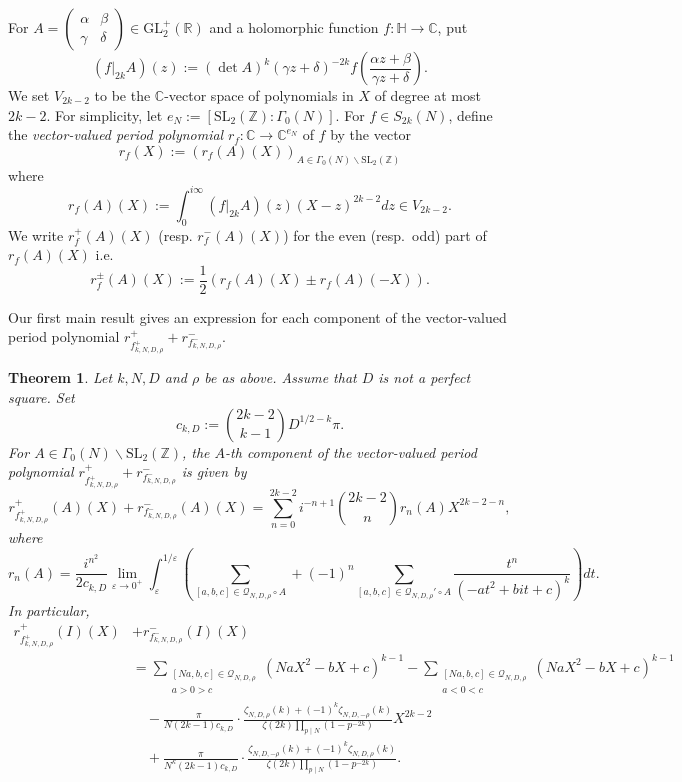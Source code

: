 \documentclass[12pt]{amsart}
\numberwithin{equation}{section}
\newtheorem{theorem}{Theorem}[section]
\theoremstyle{definition}
\begin{document}
For $A=\left(\begin{smallmatrix}
    \alpha & \beta \\ \gamma & \delta
\end{smallmatrix}\right)\in\mathrm{GL}_{2}^{+}(\mathbb{R})$ and a holomorphic function $f:\mathbb{H}\rightarrow\mathbb{C}$, put
$$(f|_{2k}A)(z):=(\det A)^{k}(\gamma z+\delta)^{-2k}f\left(\frac{\alpha z+\beta}{\gamma z+\delta}\right).$$
We set $V_{2k-2}$ to be the $\mathbb{C}$-vector space of polynomials in $X$ of degree at most $2k-2$. For simplicity, let $e_{N}:=[\mathrm{SL}_{2}(\mathbb{Z}):\Gamma_{0}(N)]$.
For $f\in S_{2k}(N)$, define the \textit{vector-valued period polynomial} $r_{f}:\mathbb{C}\rightarrow\mathbb{C}^{e_{N}}$ of $f$ by the vector
$$r_{f}(X):=(r_{f}(A)(X))_{A\in\Gamma_{0}(N)\backslash\mathrm{SL}_{2}(\mathbb{Z})}$$
where
$$r_{f}(A)(X):=\int_{0}^{i\infty}(f|_{2k}A)(z)(X-z)^{2k-2}dz\in V_{2k-2}.$$
We write $r_{f}^{+}(A)(X)$ (resp. $r_{f}^{-}(A)(X)$) for the even (resp.\ odd) part of $r_{f}(A)(X)$ i.e.
$$r_{f}^{\pm}(A)(X):=\frac{1}{2}(r_{f}(A)(X)\pm r_{f}(A)(-X)).$$

Our first main result gives an expression for each component of the vector-valued period polynomial $r_{f_{k,N,D,\rho}^{+}}^{+}+r_{f_{k,N,D,\rho}^{-}}^{-}$.

\begin{theorem}\label{thm-period}
Let $k,N,D$ and $\rho$ be as above. Assume that $D$ is not a perfect square. Set
$$c_{k,D}:=\binom{2k-2}{k-1}D^{1/2-k}\pi.$$
For $A\in\Gamma_{0}(N)\backslash \mathrm{SL}_{2}(\mathbb{Z})$, the $A$-th component of the vector-valued period polynomial $r_{f_{k,N,D,\rho}^{+}}^{+}+r_{f_{k,N,D,\rho}^{-}}^{-}$ is given by
$$r_{f_{k,N,D,\rho}^{+}}^{+}(A)(X)+r_{f_{k,N,D,\rho}^{-}}^{-}(A)(X)=\sum_{n=0}^{2k-2}i^{-n+1}\binom{2k-2}{n}r_{n}(A)X^{2k-2-n},$$
where
\begin{equation*}
    r_{n}(A)=\frac{i^{n^{2}}}{2c_{k,D}}\lim_{\varepsilon\rightarrow 0^{+}}\int_{\varepsilon}^{1/\varepsilon}\left(\sum_{[a,b,c]\in\mathcal{Q}_{N,D,\rho}\circ A}+(-1)^{n}\sum_{[a,b,c]\in\mathcal{Q}_{N,D,\rho}'\circ A}\frac{t^{n}}{(-at^{2}+bit+c)^{k}}\right)dt.
\end{equation*}
In particular,
\begin{align*}
r_{f_{k,N,D,\rho}^{+}}^{+}(I)(X)&+r_{f_{k,N,D,\rho}^{-}}^{-}(I)(X)\\
&=\sum_{\substack{[Na,b,c]\in\mathcal{Q}_{N,D,\rho}\\ a>0>c}}
(NaX^{2}-bX+c)^{k-1}-\sum_{\substack{[Na,b,c]\in\mathcal{Q}_{N,D,\rho}\\ a<0<c}}(NaX^{2}-bX+c)^{k-1}\\
&\quad-\frac{\pi }{N(2k-1)c_{k,D}}
\cdot
\frac{\zeta_{N,D,\rho}(k)+(-1)^{k}\zeta_{N,D,-\rho}(k)}{\zeta(2k)\prod_{p\mid N}(1-p^{-2k})}X^{2k-2}\\
&\quad+\frac{\pi }{N^{k}(2k-1)c_{k,D}}
\cdot
\frac{\zeta_{N,D,-\rho}(k)+(-1)^{k}\zeta_{N,D,\rho}(k)}{\zeta(2k)\prod_{p\mid N}(1-p^{-2k})}.
\end{align*}
\end{theorem}
\end{document}
